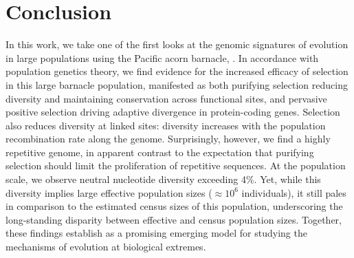 \section*{Conclusion}

In this work, we take one of the first looks at the genomic signatures of evolution
in large populations using the Pacific acorn barnacle, \balgla{}.
In accordance with population genetics theory, we find evidence for the increased
efficacy of selection in this large barnacle population, manifested as both purifying
selection reducing diversity and maintaining conservation across functional sites, and
pervasive positive selection driving adaptive divergence in protein-coding genes.
Selection also reduces diversity at linked sites: diversity increases with the
population recombination rate along the genome.
Surprisingly, however, we find a highly repetitive genome, in apparent contrast to
the expectation that purifying selection should limit the proliferation of repetitive
sequences.
At the population scale, we observe neutral nucleotide diversity exceeding 4\%.
Yet, while this diversity implies large effective population sizes ($\approx10^{6}$
individuals), it still pales in comparison to the estimated census sizes
of this population, underscoring the long-standing disparity between effective
and census population sizes.
Together, these findings establish \bgla{} as a promising emerging model for studying
the mechanisms of evolution at biological extremes.

